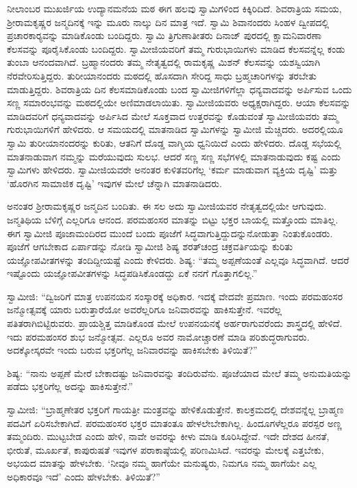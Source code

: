  ನೀಲಾಂಬರ ಮುಖರ್ಜಿಯ ಉದ್ಯಾನಮನೆಯ ಮಠ ಈಗ ಹಲವು ಸ್ವಾಮಿಗಳಿಂದ ಕಿಕ್ಕಿರಿದಿದೆ. ಶಿವರಾತ್ರಿಯ ಸಮಯ, ಶ‍್ರೀರಾಮಕೃಷ್ಣರ ಜನ್ಮದಿನಕ್ಕೆ ಇನ್ನು ಮೂರು ನಾಲ್ಕು ದಿನ ಮಾತ್ರ ಇದೆ. ಸ್ವಾಮಿ ಶಿವಾನಂದರು ಸಿಂಹಳ ದ್ವೀಪದಲ್ಲಿ ಪ್ರಚಾರಕಾರ‍್ಯವನ್ನು ಮಾಡಿಕೊಂಡು ಬಂದಿದ್ದರು. ಸ್ವಾಮಿ ತ್ರಿಗುಣಾತೀತರು ದಿನಾಜ್ ಪುರದಲ್ಲಿ ಕ್ಷಾಮನಿವಾರಣಾ ಕೆಲಸವನ್ನು ಪೂರೈಸಿಕೊಂಡು ಬಂದಿದ್ದರು. ಸ್ವಾಮೀಜಿಯವರಿಗೆ ತಮ್ಮ ಗುರುಭಾಯಿಗಳು ಮಾಡಿದ ಕೆಲಸವನ್ನೆಲ್ಲ ಕಂಡು ತುಂಬಾ ಆನಂದವಾಗಿದೆ. ಬ್ರಹ್ಮಾನಂದರು ತಮ್ಮ ನೇತೃತ್ವದಲ್ಲಿ ರಾಮಕೃಷ್ಣ ಮಿಶನ್ ಕೆಲಸವನ್ನು ಯಶಸ್ವಿಯಾಗಿ ನೆರವೇರಿಸುತ್ತಿದ್ದರು. ತುರೀಯಾನಂದರು ಮಠದಲ್ಲಿ ಹೊಸದಾಗಿ ಸೇರಿದ್ದ ಸಾಧು ಬ್ರಹ್ಮಚಾರಿಗಳನ್ನು ತರಬೇತು ಮಾಡುತ್ತಿದ್ದರು. ಶಿವರಾತ್ರಿಯ ದಿನ ಕೆಲಸಮಾಡಿಕೊಂಡು ಬಂದ ಸ್ವಾಮೀಜಿಗಳಿಗೆಲ್ಲಾ ಧನ್ಯವಾದವನ್ನು ಅರ್ಪಿಸುವ ಒಂದು ಸಣ್ಣ ಸಮಾರಂಭವನ್ನು ಮಠದಲ್ಲಿಯೇ ಅಣಿಮಾಡಲಾಯಿತು. ಸ್ವಾಮೀಜಿಯವರು ಅಧ್ಯಕ್ಷರಾಗಿದ್ದರು. ಆಯಾ ಕೆಲಸವನ್ನು ಮಾಡಿದವರಿಗೆ ಧನ್ಯವಾದವನ್ನು ಅರ್ಪಿಸಿದ ಮೇಲೆ ಸೂಕ್ತವಾದ ಉತ್ತರವನ್ನು ಕೊಡುವಂತೆ ಸ್ವಾಮೀಜಿಯವರು ತಮ್ಮ ಗುರುಭಾಯಿಗಳಿಗೆ ಹೇಳಿದರು. ಆ ಸಮಯದಲ್ಲಿ ಮಾತನಾಡಿದ ಸ್ವಾಮಿಗಳನ್ನು ಸ್ವಾಮೀಜಿ ಮೆಚ್ಚಿದರು. ಅದರಲ್ಲಿಯೂ ಸ್ವಾಮಿ ತುರೀಯಾನಂದರನ್ನು ಕುರಿತು, ಆತನಿಗೆ ದೊಡ್ಡ ವಾಗ್ಮಿಯ ಧ್ವನಿಯಿದೆ ಎಂದು ಹೇಳಿದರು. ದೊಡ್ಡ ಸಭೆಯಲ್ಲಿ ಮಾತನಾಡುವಾಗ ನಮ್ಮನ್ನು ಮರೆಯುವುದು ಸುಲಭ. ಆದರೆ ಸಣ್ಣ ಸಣ್ಣ ಸಭೆಗಳಲ್ಲಿ ಮಾತನಾಡುವುದು ಕಷ್ಟ ಎಂದು ಸ್ವಾಮಿಗಳು ಹೇಳಿದರು. ಸ್ವಾಮೀಜಿಯವರೇ ಅನಂತರ ಕುಳಿತವರಿಗೆಲ್ಲ ‘ಕರ್ಮ ಮಾಡುವಾಗ ವ್ಯಕ್ತಿಯ ದೃಷ್ಟಿ’ ಮತ್ತು ‘ಹೊರಗಿನ ಸಾಮಾಜಿಕ ದೃಷ್ಟಿ’ ಇವುಗಳ ಮೇಲೆ ಚೆನ್ನಾಗಿ ಮಾತನಾಡಿದರು. 

 ಅನಂತರ ಶ‍್ರೀರಾಮಕೃಷ್ಣರ ಜನ್ಮದಿನ ಬಂದಿತು. ಈ ಸಲ ಅದು ಸ್ವಾಮೀಜಿಯವರ ನೇತೃತ್ವದಲ್ಲಿಯೇ ಆಗುವುದು. ಜನ್ಮತಿಥಿಯ ಬೆಳಿಗ್ಗೆ ಎಲ್ಲರಿಗೂ ಆನಂದ. ಪರಮಹಂಸರ ಮಾತನ್ನು ಬಿಟ್ಟು ಭಕ್ತರ ಬಾಯಲ್ಲಿ ಮತ್ತೊಂದು ಮಾತಿಲ್ಲ. ಈಗ ಸ್ವಾಮೀಜಿ ಪೂಜಾಮಂದಿರದ ಮುಂದೆ ಬಂದು ಪೂಜೆಗೆ ಸಿದ್ಧವಾಗುತ್ತಿದ್ದುದನ್ನು\break ನೋಡುತ್ತಾ ನಿಂತುಕೊಂಡರು. ಪೂಜೆಗೆ ಆಗಬೇಕಾದ ಏರ್ಪಾಡನ್ನು ನೋಡಿ ಸ್ವಾಮೀಜಿ ಶಿಷ್ಯ ಶರತ್‍ಚಂದ್ರ ಚಕ್ರವರ್ತಿಯನ್ನು ಕುರಿತು ಯಜ್ಞೋಪವೀತಗಳನ್ನು ತಂದಿದ್ದೀಯಷ್ಟೆ ಎಂದು ಕೇಳಿದರು. ಶಿಷ್ಯ: “ತಮ್ಮ ಅಪ್ಪಣೆಯಂತೆ ಎಲ್ಲವೂ ಸಿದ್ಧವಾಗಿದೆ. ಆದರೆ ಇಷ್ಟೊಂದು ಯಜ್ಞೋಪವೀತಗಳನ್ನು ಸಿದ್ಧಪಡಿಸಿಕೊಂಡದ್ದು ಏಕೆ ನನಗೆ ಗೊತ್ತಾಗಲಿಲ್ಲ.” 

 ಸ್ವಾಮೀಜಿ: “ದ್ವಿಜರಿಗೆ ಮಾತ್ರ ಉಪನಯನ ಸಂಸ್ಕಾರಕ್ಕೆ ಅಧಿಕಾರ. ಇದಕ್ಕೆ ವೇದವೇ ಪ್ರಮಾಣ. ಇಂದು ಪರಮಹಂಸರ ಜನ್ಮೋತ್ಸವಕ್ಕೆ ಯಾರು ಬರುತ್ತಾರೆಯೋ ಅವರೆಲ್ಲರಿಗೂ ಜನಿವಾರವನ್ನು ಹಾಕಿಸುತ್ತೇನೆ. ಇವರೆಲ್ಲ ಪತಿತರಾಗಿಬಿಟ್ಟಿರುವರು. ಪ್ರಾಯಶ್ಚಿತ್ತ ಮಾಡಿಕೊಂಡ ಮೇಲೆ ಉಪನಯನಕ್ಕೆ ಅರ್ಹರಾಗುವರೆಂದು ಶಾಸ್ತ್ರದಲ್ಲಿ ಹೇಳಿದೆ. ಇದು ಪರಮಹಂಸರ ಶುಭ ಜನ್ಮೋತ್ಸವ. ಎಲ್ಲರೂ ಅವರ ನಾಮೋಚ್ಚಾರಣೆ ಮಾಡಿ ಪರಿಶುದ್ಧರಾಗುವರು. ಅದಕ್ಕೋಸ್ಕರವೇ ಇಂದು ಬರುವ ಭಕ್ತರಿಗೆಲ್ಲ ಜನಿವಾರವನ್ನು ಹಾಕಿಸಬೇಕು ತಿಳಿಯಿತೆ?” 

 ಶಿಷ್ಯ: “ನಾನು ಅಪ್ಪಣೆ ಮೇರೆ ಬೇಕಾದಷ್ಟು ಜನಿವಾರವನ್ನು ತಂದಿರುವೆನು. ಪೂಜೆಯಾದ ಮೇಲೆ ತಮ್ಮ ಅನುಮತಿಯನ್ನು ಪಡೆದು ಭಕ್ತರಿಗೆಲ್ಲ ಅದನ್ನು ಹಾಕಿಸುತ್ತೇನೆ.” 

 ಸ್ವಾಮೀಜಿ: “ಬ್ರಾಹ್ಮಣೇತರ ಭಕ್ತರಿಗೆ ಗಾಯತ್ರೀ ಮಂತ್ರವನ್ನು ಹೇಳಿಕೊಡುತ್ತೇನೆ. ಕಾಲಕ್ರಮದಲ್ಲಿ ದೇಶವನ್ನೆಲ್ಲ ಬ್ರಾಹ್ಮಣ ಪದವಿಗೆ ಏರಿಸಬೇಕಾಗಿದೆ. ಪರಮಹಂಸರ ಭಕ್ತರ ಮಾತಂತೂ ಹೇಳಲೇಬೇಕಾಗಿಲ್ಲ. ಹಿಂದೂಗಳೆಲ್ಲರೂ ಪರಸ್ಪರ ಅಣ್ಣ ತಮ್ಮಂದಿರು. ಮುಟ್ಟಬೇಡ ಎಂದು ಹೇಳಿ, ನಾವೇ ಅವರನ್ನು ಕೀಳು ಮಾಡಿ ಕೂರಿಸಿದ್ದೇವೆ. ಇದೇ ದೇಶದ ಹೀನತೆ, ಭೀರುತೆ, ಮೂರ್ಖತೆ, ಕಾಪುರುಷತೆ ಇವುಗಳ ಪರಾಕಾಷ್ಠೆಯಲ್ಲಿ ಪರಿಣಮಿಸಿದೆ. ಇವರನ್ನು ಮೇಲಕ್ಕೆ ಎತ್ತಬೇಕು, ಅಭಯದ ಮಾತನ್ನು ಹೇಳಬೇಕು. ‘ನೀವೂ ನಮ್ಮ ಹಾಗೆಯೇ ಮನುಷ್ಯರು, ನಿಮಗೂ ನಮ್ಮ ಹಾಗೆಯೇ ಎಲ್ಲ ಅಧಿಕಾರವೂ ಇದೆ’ ಎಂದು ಹೇಳಬೇಕು. ತಿಳಿಯಿತೆ?” 

